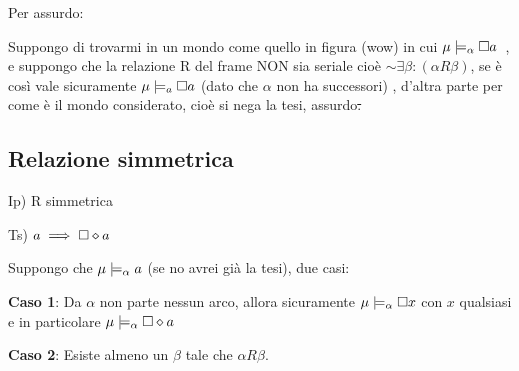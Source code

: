 Per assurdo:

Suppongo di trovarmi in un mondo come quello in figura (wow) in cui
\mbox{$\mu\models_{\alpha}\square a$ }, e suppongo che la relazione
R del frame NON sia seriale cioè $\sim\exists\beta:(\alpha R\beta)$,
se è così vale sicuramente $\mu\models_{a}\square a$ (dato che $\alpha$
non ha successori) , d'altra parte per come è il mondo considerato,
cioè si nega la tesi, assurdo\sout{.}


\subsection{Relazione simmetrica}

Ip) R simmetrica

Ts) $a\implies\square\diamond a$

Suppongo che $\mu\models_{\alpha}a$ (se no avrei già la tesi), due
casi:

\textbf{Caso 1}: Da $\alpha$ non parte nessun arco, allora sicuramente
$\mu\models_{\alpha}\square x$ con $x$ qualsiasi e in particolare
$\mu\models_{\alpha}\square\diamond a$

\begin{center}
\begin{center} 
\end{center} 
\par\end{center}

\textbf{Caso 2}: Esiste almeno un $\beta$ tale che $\alpha R\beta$.

